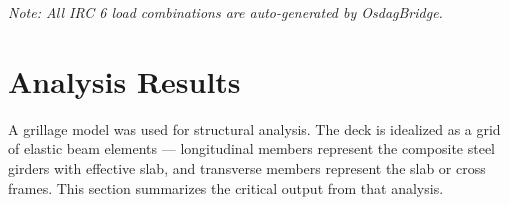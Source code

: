 \documentclass[12pt,a4paper]{report}
\numberwithin{table}{chapter}
\numberwithin{figure}{chapter}
\renewcommand{\arraystretch}{1.15}
\begin{document}
\noindent\textit{Note: All IRC 6 load combinations are auto-generated by OsdagBridge.}


\chapter{Analysis Results}

A grillage model was used for structural analysis. The deck is idealized as a grid of elastic beam elements --- longitudinal members represent the composite steel girders with effective slab, and transverse members represent the slab or cross frames. This section summarizes the critical output from that analysis.

\vspace{1em}
\begingroup
\footnotesize
\setlength{\tabcolsep}{3pt}
\renewcommand{\arraystretch}{1.25}
\end{document}
